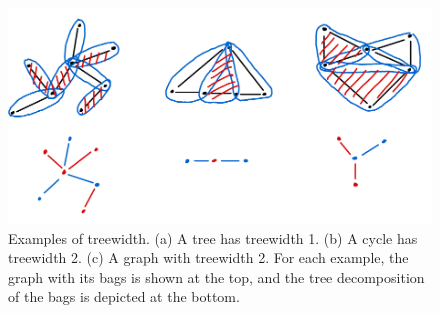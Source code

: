 \begin{figure}
    \includegraphics[width=\textwidth]{figures/treewidth-example.png}
    \caption{Examples of treewidth. (a) A tree has treewidth 1. (b) A cycle has treewidth 2. (c) A graph with treewidth 2. For each example, the graph with its bags is shown at the top, and the tree decomposition of the bags is depicted at the bottom. }
    \label{fig:treewidth-example}
\end{figure}